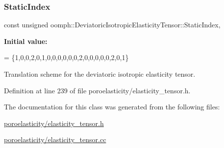 \subsubsection{\texorpdfstring{Static\+Index}{StaticIndex}}
{\footnotesize\ttfamily const unsigned oomph\+::\+Deviatoric\+Isotropic\+Elasticity\+Tensor\+::\+Static\+Index\hspace{0.3cm}{\ttfamily [static]}, {\ttfamily [private]}}

{\bfseries Initial value\+:}
\begin{DoxyCode}
=
 \{1,0,0,2,0,1,0,0,0,0,0,0,2,0,0,0,0,0,2,0,1\}
\end{DoxyCode}


Translation scheme for the deviatoric isotropic elasticity tensor. 



Definition at line 239 of file poroelasticity/elasticity\+\_\+tensor.\+h.



The documentation for this class was generated from the following files\+:\begin{DoxyCompactItemize}
\item 
\hyperlink{poroelasticity_2elasticity__tensor_8h}{poroelasticity/elasticity\+\_\+tensor.\+h}\item 
\hyperlink{poroelasticity_2elasticity__tensor_8cc}{poroelasticity/elasticity\+\_\+tensor.\+cc}\end{DoxyCompactItemize}
